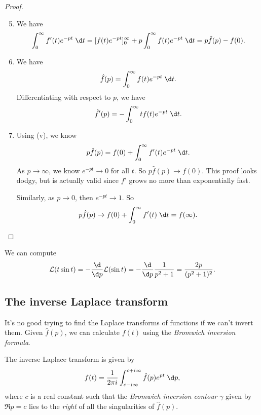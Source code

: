 \documentclass[a4paper]{article}
\begin{document}
\begin{proof}\leavevmode
  \begin{enumerate}\setcounter{enumi}{4}
    \item We have
      \[
        \int_0^\infty f'(t) e^{-pt}\;\d t = [f(t) e^{-pt}]^{\infty}_0 + p \int_0^\infty f(t) e^{-pt}\;\d t = p \hat{f}(p) - f(0).
      \]
    \item We have
      \[
        \hat{f}(p) = \int_0^\infty f(t) e^{-pt}\;\d t.
      \]
      Differentiating with respect to $p$, we have
      \[
        \hat{f}'(p) = -\int_0^\infty t f(t) e^{-pt}\;\d t.
      \]
    \item Using (v), we know
      \[
        p\hat{f}(p) = f(0) + \int_0^\infty f'(t) e^{-pt} \;\d t.
      \]
      As $p \to \infty$, we know $e^{-pt} \to 0$ for all $t$. So $p \hat{f}(p) \to f(0)$. This proof looks dodgy, but is actually valid since $f'$ grows no more than exponentially fast.

      Similarly, as $p \to 0$, then $e^{-pt} \to 1$. So
      \[
        p \hat{f}(p) \to f(0) + \int_0^\infty f'(t) \;\d t = f(\infty).
      \]
  \end{enumerate}
\end{proof}

\begin{eg}
  We can compute
  \[
    \mathcal{L}(t \sin t) = -\frac{\d}{\d p} \mathcal{L}(\sin t) = -\frac{\d}{\d p} \frac{1}{p^2 + 1} = \frac{2p}{(p^2 + 1)^2}.
  \]
\end{eg}

\subsection{The inverse Laplace transform}
It's no good trying to find the Laplace transforms of functions if we can't invert them. Given $\hat{f}(p)$, we can calculate $f(t)$ using the \emph{Bromwich inversion formula}.
\begin{prop}
  The inverse Laplace transform is given by
  \[
    f(t) = \frac{1}{2\pi i} \int_{c - i \infty}^{c + i\infty} \hat{f}(p) e^{pt} \;\d p,
  \]
  where $c$ is a real constant such that the \emph{Bromwich inversion contour} $\gamma$ given by $\Re p = c$ lies to the \emph{right} of all the singularities of $\hat{f}(p)$.
\end{prop}
\end{document}
